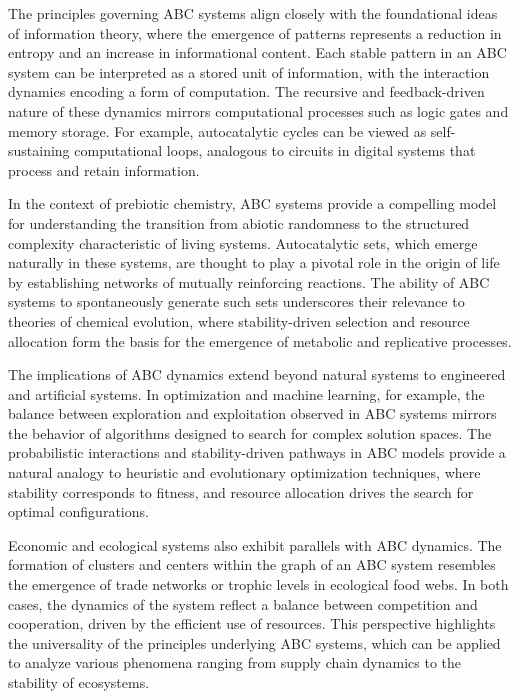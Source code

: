 \documentclass[%
 preprint, linenumbers,
 amsmath,amssymb,
 aps, physrev,
]{revtex4-2}
\begin{document}
The principles governing ABC systems align closely with the foundational ideas of information theory, where the emergence of patterns represents a reduction in entropy and an increase in informational content. Each stable pattern in an ABC system can be interpreted as a stored unit of information, with the interaction dynamics encoding a form of computation. The recursive and feedback-driven nature of these dynamics mirrors computational processes such as logic gates and memory storage. For example, autocatalytic cycles can be viewed as self-sustaining computational loops, analogous to circuits in digital systems that process and retain information.

In the context of prebiotic chemistry, ABC systems provide a compelling model for understanding the transition from abiotic randomness to the structured complexity characteristic of living systems. Autocatalytic sets, which emerge naturally in these systems, are thought to play a pivotal role in the origin of life by establishing networks of mutually reinforcing reactions. The ability of ABC systems to spontaneously generate such sets underscores their relevance to theories of chemical evolution, where stability-driven selection and resource allocation form the basis for the emergence of metabolic and replicative processes.

The implications of ABC dynamics extend beyond natural systems to engineered and artificial systems. In optimization and machine learning, for example, the balance between exploration and exploitation observed in ABC systems mirrors the behavior of algorithms designed to search for complex solution spaces. The probabilistic interactions and stability-driven pathways in ABC models provide a natural analogy to heuristic and evolutionary optimization techniques, where stability corresponds to fitness, and resource allocation drives the search for optimal configurations.

Economic and ecological systems also exhibit parallels with ABC dynamics. The formation of clusters and centers within the graph of an ABC system resembles the emergence of trade networks or trophic levels in ecological food webs. In both cases, the dynamics of the system reflect a balance between competition and cooperation, driven by the efficient use of resources. This perspective highlights the universality of the principles underlying ABC systems, which can be applied to analyze various phenomena ranging from supply chain dynamics to the stability of ecosystems.
\end{document}
